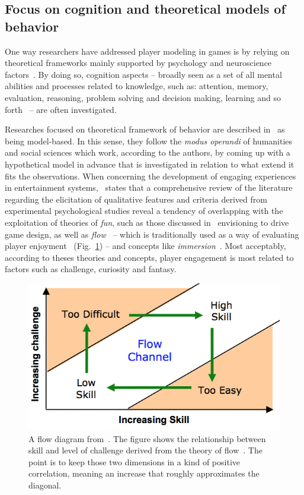 \subsection{Focus on cognition and theoretical models of behavior}
One way researchers have addressed player modeling in games is by relying on theoretical frameworks mainly supported by psychology and neuroscience factors~\cite{yannakakis2013player}. By doing so, cognition aspects -- broadly seen as a set of all mental abilities and processes related to knowledge, such as: attention, memory, evaluation, reasoning, problem solving and decision making, learning and so forth~\cite{wiki:cognition} -- are often investigated. 

Researches focused on theoretical framework of behavior are described in~\cite{yannakakis2013player} as being model-based. In this sense, they follow the \textit{modus operandi} of humanities and social sciences which work, according to the authors, by coming up with a hypothetical model in advance that is investigated in relation to what extend it fits the observations. When concerning the development of engaging experiences in entertainment systems,~\cite{yannakakis2008model} states that a comprehensive review of the literature regarding the elicitation of qualitative features and criteria derived from experimental psychological studies reveal a tendency of overlapping with the exploitation of theories of \textit{fun}, such as those discussed in~\cite{Malone:1980, lazzaro, Koster:2013} envisioning to drive game design, as well as \textit{flow}~\cite{Csikszentmihalyi91} -- which is traditionally used as a way of evaluating player enjoyment~\cite{Sweetser2005, Cowley2008} (Fig.~\ref{flowDiagram}) -- and concepts like \textit{immersion}~\cite{calleja2007digital}. Most acceptably, according to theses theories and concepts, player engagement is most related to factors such as challenge, curiosity and fantasy.

\begin{figure}[htp]
  \centering  
  \includegraphics[]{images/02-art/flowDiagram.png}
  \caption{A flow diagram from~\cite{hunicke2004ai}. The figure shows the relationship between skill and level of challenge derived from the theory of flow~\cite{Csikszentmihalyi91}. The point is to keep those two dimensions in a kind of positive correlation, meaning an increase that roughly approximates the diagonal.}
   \label{flowDiagram}
\end{figure}

